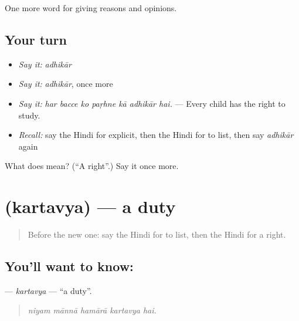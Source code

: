 \begin{grammarlens}[title={What you've built}]
One more word for giving reasons and opinions.
\end{grammarlens}

\subsection*{Your turn}
\begin{itemize}
\raggedright
  \item \emph{Say it:} \emph{adhikār}
  \item \emph{Say it:} \emph{adhikār}, once more
  \item \emph{Say it:} \emph{har bacce ko paṛhne kā adhikār hai.} — Every child has the right to study.
  \item \emph{Recall:} say the Hindi for explicit, then the Hindi for to list, then say \emph{adhikār} again
\end{itemize}

\begin{tcolorbox}[breakable,colback=teal!4,colframe=teal!35!black,title={Before you move on}]
What does  mean? (\textquotedblleft{}A right\textquotedblright{}.) Say it once more.
\end{tcolorbox}
\section[\texorpdfstring{\hi{कर्तव्य} (kartavya)}{कर्तव्य (kartavya)}]{ (kartavya) — a duty}

\label{lesson:HI-C351-kartavya}



\begin{quote}
Before the new one: say the Hindi for to list, then the Hindi for a right.
\end{quote}

\subsection*{You'll want to know: }
\textbf{} — \emph{kartavya} — \textquotedblleft{}a duty\textquotedblright{}.

\begin{quote}
    
\end{quote}

\begin{quote}
\emph{niyam mānnā hamārā kartavya hai.}
\end{quote}

